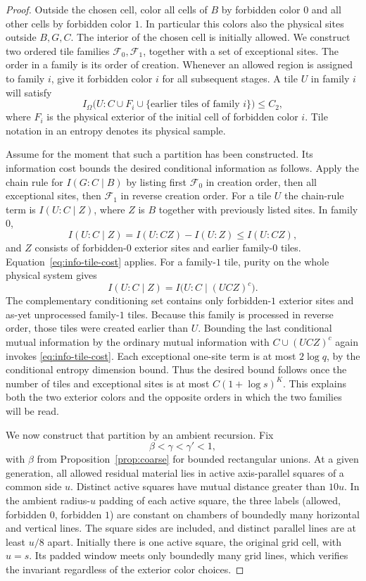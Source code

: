 \documentclass[11pt]{article}
\numberwithin{equation}{section}
\theoremstyle{definition}
\theoremstyle{remark}
\begin{document}
\begin{proof}
Outside the chosen cell, color all cells of $B$ by forbidden color $0$
and all other cells by forbidden color $1$.  In particular this colors
also the physical sites outside $B,G,C$.  The interior of the chosen
cell is initially allowed.  We construct two ordered tile families
$\mathcal F_0,\mathcal F_1$, together with a set of exceptional sites.
The order in a family is its order of creation.  Whenever an allowed
region is assigned to family $i$, give it forbidden color $i$ for all
subsequent stages.  A tile $U$ in family $i$ will satisfy
\begin{equation}
 I_\Omega\bigl(U:C\cup F_i\cup
       \{\text{earlier tiles of family }i\}\bigr)\le C_2,
 \label{eq:info-tile-cost}
\end{equation}
where $F_i$ is the physical exterior of the initial cell of forbidden
color $i$.  Tile notation in an entropy denotes its physical sample.

Assume for the moment that such a partition has been constructed.  Its
information cost bounds the desired conditional information as follows.
Apply the chain rule
for $I(G:C\mid B)$ by listing first $\mathcal F_0$ in creation order,
then all exceptional sites, then $\mathcal F_1$ in reverse creation
order.  For a tile $U$ the chain-rule term is $I(U:C\mid Z)$, where
$Z$ is $B$ together with previously listed sites.  In family $0$,
\[
 I(U:C\mid Z)=I(U:CZ)-I(U:Z)\le I(U:CZ),
\]
and $Z$ consists of forbidden-$0$ exterior sites and earlier
family-$0$ tiles.  Equation~\eqref{eq:info-tile-cost} applies.
For a family-$1$ tile, purity on the whole physical system gives
\[
 I(U:C\mid Z)=I\bigl(U:C\mid(UCZ)^c\bigr).
\]
The complementary conditioning set contains only forbidden-$1$
exterior sites and as-yet unprocessed family-$1$ tiles.  Because this
family is processed in reverse order, those tiles were created earlier
than $U$.  Bounding the last conditional mutual information by the
ordinary mutual information with $C\cup(UCZ)^c$ again invokes
\eqref{eq:info-tile-cost}.  Each exceptional one-site term is at most
$2\log q$, by the conditional entropy dimension bound.  Thus the desired
bound follows once the number of tiles and exceptional sites is at most
$C(1+\log s)^K$.  This explains both the two exterior
colors and the opposite orders in which the two families will be read.

We now construct that partition by an ambient recursion.  Fix
\[
 \beta<\gamma<\gamma'<1,
\]
with $\beta$ from Proposition~\ref{prop:coarse} for bounded rectangular
unions.  At a given generation, all allowed residual material lies in
active axis-parallel squares of a common side $u$.  Distinct active
squares have mutual distance greater than $10u$.  In the ambient
radius-$u$ padding of each active square, the three labels (allowed,
forbidden $0$, forbidden $1$) are constant on chambers of boundedly
many horizontal and vertical lines.  The square sides are included,
and distinct parallel lines are at least $u/8$ apart.  Initially there
is one active square, the original grid cell, with $u=s$.  Its padded
window meets only boundedly many grid lines, which verifies the
invariant regardless of the exterior color choices.


\end{proof}
\end{document}
